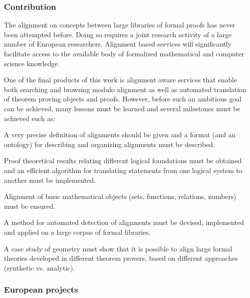 \subsubsection*{Contribution}

The alignment on concepts between large libraries of formal proofs has
never been attempted before.  Doing so requires a joint research
activity of a large number of European researchers.  Alignment based
services will significantly
facilitate access to the available body of formalized mathematical and
computer science knowledge.

One of the final products of this work is alignment aware services
that enable both searching and browsing modulo alignment as well as
automated translation of theorem proving objects and proofs.  However,
before such an ambitious goal can be achieved, many lessons must be
learned and several milestones must be achieved such as:
\begin{compactitem}
\item A very precise definition of alignments should be given and a
  format (and an ontology) for describing and organizing alignments
  must be described.
\item Proof theoretical results relating different logical foundations
  must be obtained and an efficient algorithm for translating
  statements from one logical system to another must be implemented.
\item Alignment of basic mathematical objects (sets, functions,
  relations, numbers) must be ensured.
\item A method for automated detection of alignments must be devised,
  implemented and applied on a large corpus of formal libraries.
\item A case study of geometry must show that it is possible to align
  large formal theories developed in different theorem provers, based
  on different approaches (synthetic vs. analytic).
\end{compactitem}


\subsubsection*{European projects}

